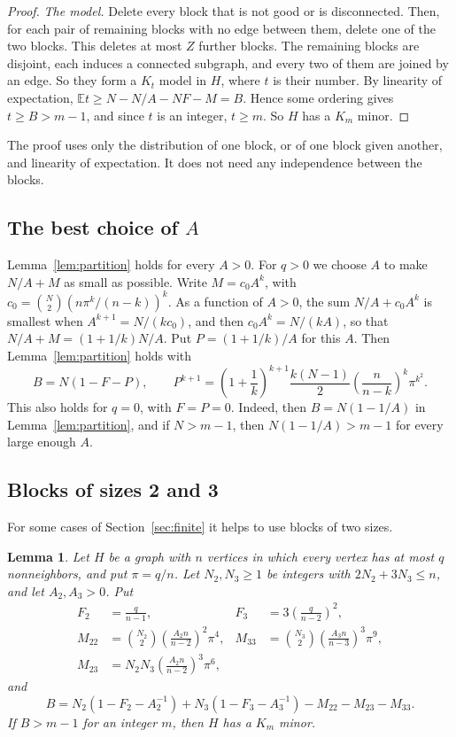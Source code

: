 \documentclass[11pt]{article}
\newtheorem{lemma}{Lemma}
\newcommand{\E}{\mathbb E}
\begin{document}
\begin{proof}
\emph{The model.} Delete every block that is not good or is disconnected.
Then, for each pair of remaining blocks with no edge between them, delete one
of the two blocks. This deletes at most $Z$ further blocks. The remaining
blocks are disjoint, each induces a connected subgraph, and every two of them
are joined by an edge. So they form a $K_t$ model in $H$, where $t$ is their
number. By linearity of expectation, $\E t\ge N-N/A-NF-M=B$. Hence some
ordering gives $t\ge B>m-1$, and since $t$ is an integer, $t\ge m$. So $H$ has
a $K_m$ minor.
\end{proof}

The proof uses only the distribution of one block, or of one block given
another, and linearity of expectation. It does not need any independence
between the blocks.

\subsection{The best choice of \texorpdfstring{$A$}{A}}

Lemma~\ref{lem:partition} holds for every $A>0$. For $q>0$ we choose $A$ to
make $N/A+M$ as small as possible. Write $M=c_0A^k$, with
$c_0=\binom N2(n\pi^k/(n-k))^k$. As a function of $A>0$, the sum
$N/A+c_0A^k$ is smallest when $A^{k+1}=N/(kc_0)$, and then $c_0A^k=N/(kA)$, so
that $N/A+M=(1+1/k)N/A$. Put $P=(1+1/k)/A$ for this $A$. Then
Lemma~\ref{lem:partition} holds with
\begin{equation}\label{eq:optimized}
 B=N(1-F-P),\qquad
 P^{k+1}=\left(1+\frac1k\right)^{k+1}
 \frac{k(N-1)}2\left(\frac n{n-k}\right)^k\pi^{k^2}.
\end{equation}
This also holds for $q=0$, with $F=P=0$. Indeed, then $B=N(1-1/A)$ in
Lemma~\ref{lem:partition}, and if $N>m-1$, then $N(1-1/A)>m-1$ for every
large enough $A$.

\subsection{Blocks of sizes 2 and 3}

For some cases of Section~\ref{sec:finite} it helps to use blocks of two
sizes.

\begin{lemma}\label{lem:mixed}
Let $H$ be a graph with $n$ vertices in which every vertex has at most $q$
nonneighbors, and put $\pi=q/n$. Let $N_2,N_3\ge1$ be integers with
$2N_2+3N_3\le n$, and let $A_2,A_3>0$. Put
\begin{align*}
 F_2&=\frac q{n-1},& F_3&=3\left(\frac q{n-2}\right)^2,\\
 M_{22}&=\binom{N_2}{2}\left(\frac{A_2n}{n-2}\right)^2\pi^4,&
 M_{33}&=\binom{N_3}{2}\left(\frac{A_3n}{n-3}\right)^3\pi^9,\\
 M_{23}&=N_2N_3\left(\frac{A_2n}{n-2}\right)^3\pi^6,
\end{align*}
and
\begin{equation}\label{eq:mixed}
 B=N_2(1-F_2-A_2^{-1})+N_3(1-F_3-A_3^{-1})-M_{22}-M_{23}-M_{33}.
\end{equation}
If $B>m-1$ for an integer $m$, then $H$ has a $K_m$ minor.
\end{lemma}
\end{document}

